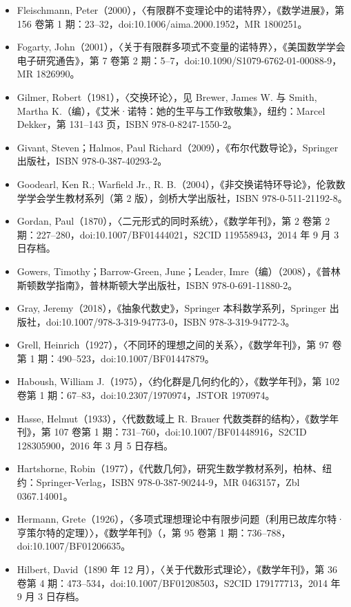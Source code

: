 \begin{itemize}
\item Fleischmann, Peter（2000），〈有限群不变理论中的诺特界〉，《数学进展》，第 156 卷第 1 期：23–32，doi:10.1006/aima.2000.1952，MR 1800251。
\item Fogarty, John（2001），〈关于有限群多项式不变量的诺特界〉，《美国数学学会电子研究通告》，第 7 卷第 2 期：5–7，doi:10.1090/S1079-6762-01-00088-9，MR 1826990。
\item Gilmer, Robert（1981），〈交换环论〉，见 Brewer, James W. 与 Smith, Martha K.（编），《艾米·诺特：她的生平与工作致敬集》，纽约：Marcel Dekker，第 131–143 页，ISBN 978-0-8247-1550-2。
\item Givant, Steven；Halmos, Paul Richard（2009），《布尔代数导论》，Springer 出版社，ISBN 978-0-387-40293-2。
\item Goodearl, Ken R.; Warfield Jr., R. B.（2004），《非交换诺特环导论》，伦敦数学学会学生教材系列（第 2 版），剑桥大学出版社，ISBN 978-0-511-21192-8。
\item Gordan, Paul（1870），〈二元形式的同时系统〉，《数学年刊》，第 2 卷第 2 期：227–280，doi:10.1007/BF01444021，S2CID 119558943，2014 年 9 月 3 日存档。
\item Gowers, Timothy；Barrow-Green, June；Leader, Imre（编）（2008），《普林斯顿数学指南》，普林斯顿大学出版社，ISBN 978-0-691-11880-2。
\item Gray, Jeremy（2018），《抽象代数史》，Springer 本科数学系列，Springer 出版社，doi:10.1007/978-3-319-94773-0，ISBN 978-3-319-94772-3。
\item Grell, Heinrich（1927），〈不同环的理想之间的关系〉，《数学年刊》，第 97 卷第 1 期：490–523，doi:10.1007/BF01447879。
\item Haboush, William J.（1975），〈约化群是几何约化的〉，《数学年刊》，第 102 卷第 1 期：67–83，doi:10.2307/1970974，JSTOR 1970974。
\item Hasse, Helmut（1933），〈代数数域上 R. Brauer 代数类群的结构〉，《数学年刊》，第 107 卷第 1 期：731–760，doi:10.1007/BF01448916，S2CID 128305900，2016 年 3 月 5 日存档。
\item Hartshorne, Robin（1977），《代数几何》，研究生数学教材系列，柏林、纽约：Springer-Verlag，ISBN 978-0-387-90244-9，MR 0463157，Zbl 0367.14001。
\item Hermann, Grete（1926），〈多项式理想理论中有限步问题（利用已故库尔特·亨策尔特的定理）〉，《数学年刊》（，第 95 卷第 1 期：736–788，doi:10.1007/BF01206635。
\item Hilbert, David（1890 年 12 月），〈关于代数形式理论〉，《数学年刊》，第 36 卷第 4 期：473–534，doi:10.1007/BF01208503，S2CID 179177713，2014 年 9 月 3 日存档。

\end{itemize}
